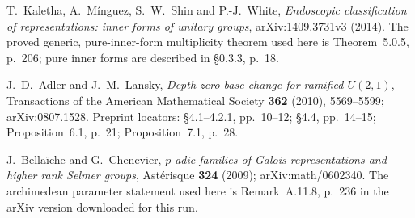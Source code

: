 T.~Kaletha, A.~M\'inguez, S.~W.~Shin and P.-J.~White,
\emph{Endoscopic classification of representations: inner forms of unitary groups},
arXiv:1409.3731v3 (2014).
The proved generic, pure-inner-form multiplicity theorem used here is
Theorem~5.0.5, p.~206; pure inner forms are described in \S0.3.3, p.~18.

J.~D.~Adler and J.~M.~Lansky,
\emph{Depth-zero base change for ramified $U(2,1)$},
Transactions of the American Mathematical Society \textbf{362} (2010),
5569--5599; arXiv:0807.1528.
Preprint locators: \S4.1--4.2.1, pp.~10--12;
\S4.4, pp.~14--15; Proposition~6.1, p.~21;
Proposition~7.1, p.~28.

J.~Bella\"iche and G.~Chenevier,
\emph{$p$-adic families of Galois representations and higher rank Selmer groups},
Ast\'erisque \textbf{324} (2009); arXiv:math/0602340.
The archimedean parameter statement used here is Remark~A.11.8,
p.~236 in the arXiv version downloaded for this run.
